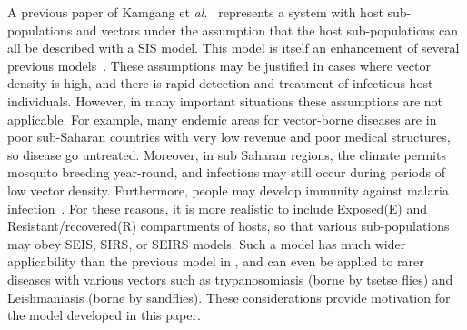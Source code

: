 \documentclass[a4paper]{article}
\begin{document}
A previous paper of Kamgang et {\em al.}~\cite{jck-19} represents a system with host sub-populations and vectors under the assumption that the host sub-populations can all be described with a SIS model. This model is itself an enhancement of several previous models~\cite{Macdonald78, Chit_08, Ross1911, NgwaMCM00, Zongo09}. These assumptions may be justified in cases where vector density is high, and there is rapid detection and treatment of infectious host individuals. However, in many important situations these assumptions are not applicable. For example, many endemic areas for vector-borne diseases are in poor sub-Saharan countries with very low revenue and poor medical structures, so disease go untreated. Moreover, in sub Saharan regions, the climate permits mosquito breeding year-round, and infections may still occur during periods of low vector density. Furthermore, people may develop immunity against malaria infection~\cite{AlOdAl, BarKris}.  For these reasons,  it is more realistic to include Exposed(E) and Resistant/recovered(R) compartments of hosts, so that various sub-populations may obey SEIS, SIRS, or SEIRS models. Such a model has much wider applicability than the previous model in \cite{jck-19}, and can even be applied to rarer diseases with various vectors such as trypanosomiasis (borne by tsetse flies) and Leishmaniasis (borne by sandflies). These considerations provide motivation for the model developed in this paper. 
\end{document}
